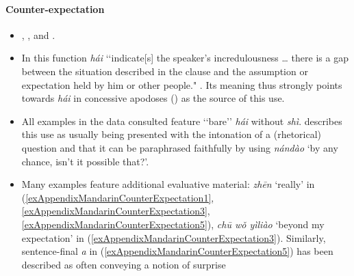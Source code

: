 \paragraph{Counter-expectation}\label{appendixMandarinModal}
\begin{itemize}
	\item \textcite[ch. 2.3]{Alleton1972}, \textcite{BiqHuang2016}, \textcite{Liu2000} and \textcite{Yeh1998}.
	\item In this function \textit{hái} \lq\lq indicate[s] the speaker's incredulousness … there is a gap between the situation described in the clause and the assumption or expectation held by him or other people." \parencite[345]{BiqHuang2016}. Its meaning thus strongly points towards \textit{hái} in concessive apodoses () as the source of this use.
	\item All examples in the data consulted feature \lq\lq bare\rq\rq{ }\textit{hái} without \textit{shì}. \textcite{Alleton1972} describes this use as usually being presented with the intonation of a (rhetorical) question and that it can be paraphrased faithfully by using \textit{nándào} \lq by any chance, isn't it possible that?\rq{}.
	\item Many examples feature additional evaluative material: \textit{zhēn} \lq really' in (\ref{exAppendixMandarinCounterExpectation1}, \ref{exAppendixMandarinCounterExpectation3}, \ref{exAppendixMandarinCounterExpectation5}), \textit{chū	wǒ yìliào} \lq beyond my expectation' in (\ref{exAppendixMandarinCounterExpectation3}). Similarly, sentence\hyp final \textit{a} in (\ref{exAppendixMandarinCounterExpectation5}) has been described as often conveying a notion of surprise \parencite{HuangShi2016}
\end{itemize}

